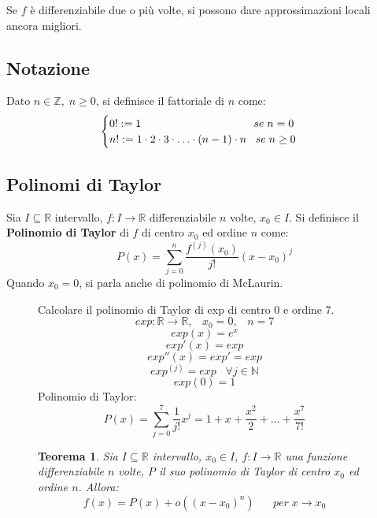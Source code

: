 \documentclass[a4paper]{article}
\newtheorem{theorem}{Teorema}
\theoremstyle{break}
\theoremstyle{break}
\theoremstyle{break}
\theoremstyle{break}
\begin{document}
Se \( f \) è differenziabile due o più volte, si possono dare approssimazioni locali ancora
migliori.

\subsection{Notazione}
Dato \( n \in \mathbb{Z},\; n \ge 0 \), si definisce il fattoriale di \( n \) come:
\[
  \begin{cases}
    0! := 1 \hspace{3.6cm} se \; n = 0\\
    n! := 1 \cdot 2 \cdot 3 \cdot \ldots \cdot (n-1) \cdot n \;\;\; se\; n \ge 0
  \end{cases}
\] 
\subsection{Polinomi di Taylor}
Sia \( I \subseteq \mathbb{R} \) intervallo, \( f: I \to \mathbb{R} \) differenziabile \( n \) volte,
\( x_0 \in I \). Si definisce il \textbf{Polinomio di Taylor} di \( f \) di centro \( x_0 \) 
ed ordine \( n \) come:
\[
  P(x) = \sum_{j=0}^{n} \frac{f^{(j)}(x_0)}{j!}(x-x_0)^j
\]  
Quando \( x_0 = 0 \), si parla anche di polinomio di McLaurin.

\begin{figure}[H]
  \begin{example}
    Calcolare il polinomio di Taylor di exp di centro 0 e ordine 7.
    \[
      exp: \mathbb{R} \to \mathbb{R}, \;\;\; x_0 = 0,\;\;\; n = 7
    \] 
    \[
      exp(x) = e^x
    \] 
    \[
      exp'(x) = exp
    \] 
    \[
      exp''(x) = exp' = exp
    \] 
    \[
      exp^{(j)} = exp \;\;\; \forall j \in \mathbb{N}
    \] 
    \[
      exp(0) = 1
    \] 
    Polinomio di Taylor:
    \[
      P(x) = \sum_{j=0}^{7} \frac{1}{j!}x^j = 1 + x + \frac{x^2}{2} + \ldots + \frac{x^7}{7!}
    \] 
  \end{example}
\end{figure}

\begin{figure}[H]
  \begin{theorem}
    Sia \( I \subseteq \mathbb{R} \) intervallo, \( x_0 \in I \), \( f: I \to \mathbb{R} \) una
    funzione differenziabile \( n \) volte, \( P \) il suo polinomio di Taylor di centro \( x_0 \) 
    ed ordine \( n \). Allora:
    \[
      f(x) = P(x) + o((x-x_0)^n)\;\;\;\;\;\; per\; x \to x_0
    \] 
  \end{theorem}
\end{figure}
\end{document}
